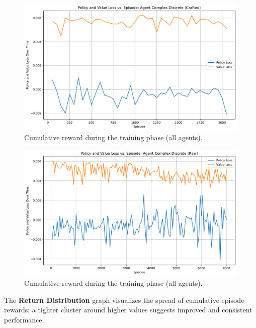 \documentclass[sigconf]{acmart}
\begin{document}
\begin{figure}[t]
  \centering
  \includegraphics[width=\textwidth]{policy_value_loss_Complex Discrete (Crafted).pdf}
  \caption{Cumulative reward during the training phase (all agents).}
  \label{fig:policy_value_loss_Complex Discrete (Crafted)}
\end{figure}

\begin{figure}[t]
  \centering
  \includegraphics[width=\textwidth]{policy_value_loss_Complex Discrete (Raw).pdf}
  \caption{Cumulative reward during the training phase (all agents).}
  \label{fig:policy_value_loss_Complex Discrete (Raw)}
\end{figure}

The \textbf{Return Distribution} graph visualizes the spread of cumulative episode rewards; a tighter cluster around higher values suggests improved and consistent performance.

\bigskip
\end{document}
